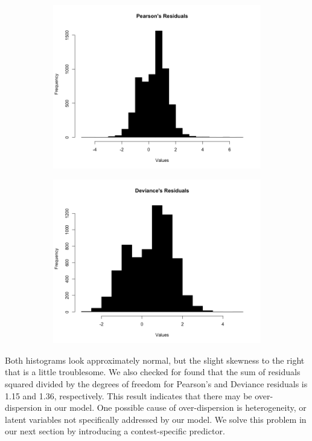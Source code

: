 \documentclass{article}
\begin{document}
\begin{figure}[H]
\centering
\begin{subfigure}{.5\textwidth}
  \centering
  \includegraphics[width=.8\linewidth]{pearson.png}
  \label{fig:sub1}
\end{subfigure}%
\begin{subfigure}{.5\textwidth}
  \centering
  \includegraphics[width=.8\linewidth]{deviance.png}
  \label{fig:sub2}
\end{subfigure}
\end{figure}

Both histograms look approximately normal, but the slight skewness to the right that is a little troublesome. We also checked for found that the sum of residuals squared divided by the degrees of freedom for Pearson's and Deviance residuals is 1.15 and 1.36, respectively. This result indicates that there may be over-dispersion in our model. One possible cause of over-dispersion is heterogeneity, or latent variables not specifically addressed by our model. We solve this problem in our next section by introducing a contest-specific predictor.
\end{document}
